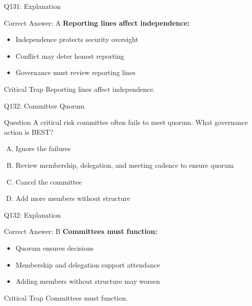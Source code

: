 \documentclass{beamer}
\begin{document}
	\begin{frame}{Q131: Explanation}
		\begin{block}{Correct Answer: A}
			\textbf{Reporting lines affect independence:}
			\begin{itemize}
				\item Independence protects security oversight
				\item Conflict may deter honest reporting
				\item Governance must review reporting lines
			\end{itemize}
		\end{block}
		\begin{alertblock}{Critical Trap}
			Reporting lines affect independence.
		\end{alertblock}
	\end{frame}
	
	\begin{frame}{Q132: Committee Quorum}
		\begin{block}{Question}
			A critical risk committee often fails to meet quorum. What governance action is BEST?
		\end{block}
		\begin{enumerate}[(A)]
			\item Ignore the failures
			\item Review membership, delegation, and meeting cadence to ensure quorum
			\item Cancel the committee
			\item Add more members without structure
		\end{enumerate}
	\end{frame}
	
	\begin{frame}{Q132: Explanation}
		\begin{block}{Correct Answer: B}
			\textbf{Committees must function:}
			\begin{itemize}
				\item Quorum ensures decisions
				\item Membership and delegation support attendance
				\item Adding members without structure may worsen
			\end{itemize}
		\end{block}
		\begin{alertblock}{Critical Trap}
			Committees must function.
		\end{alertblock}
	\end{frame}
	
\end{document}
